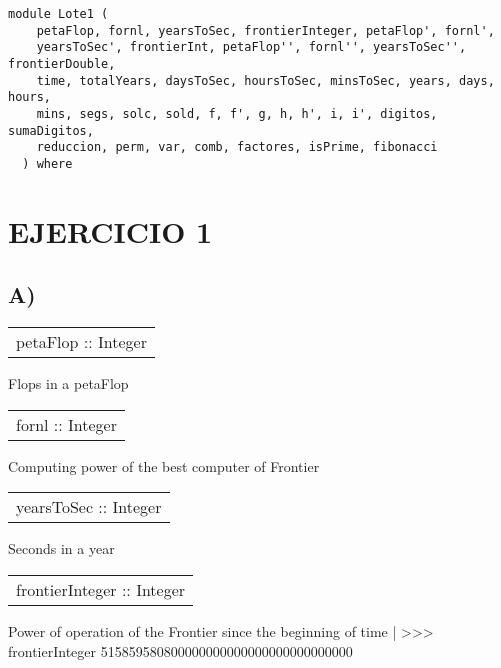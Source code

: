 \label{module:Lote1}
\haddockbeginheader
{\haddockverb\begin{verbatim}
module Lote1 (
    petaFlop, fornl, yearsToSec, frontierInteger, petaFlop', fornl',
    yearsToSec', frontierInt, petaFlop'', fornl'', yearsToSec'', frontierDouble,
    time, totalYears, daysToSec, hoursToSec, minsToSec, years, days, hours,
    mins, segs, solc, sold, f, f', g, h, h', i, i', digitos, sumaDigitos,
    reduccion, perm, var, comb, factores, isPrime, fibonacci
  ) where\end{verbatim}}
\haddockendheader

\section{EJERCICIO 1}
\subsection{A)}
\begin{haddockdesc}
\item[\begin{tabular}{@{}l}
petaFlop :: Integer
\end{tabular}]
{\haddockbegindoc
Flops in a petaFlop\par}
\end{haddockdesc}
\begin{haddockdesc}
\item[\begin{tabular}{@{}l}
fornl :: Integer
\end{tabular}]
{\haddockbegindoc
Computing power of the best computer of Frontier\par}
\end{haddockdesc}
\begin{haddockdesc}
\item[\begin{tabular}{@{}l}
yearsToSec :: Integer
\end{tabular}]
{\haddockbegindoc
Seconds in a year\par}
\end{haddockdesc}
\begin{haddockdesc}
\item[\begin{tabular}{@{}l}
frontierInteger :: Integer
\end{tabular}]
{\haddockbegindoc
Power of operation of the Frontier since the beginning of time
 | >>> frontierInteger
 515859580800000000000000000000000000\par}
\end{haddockdesc}
